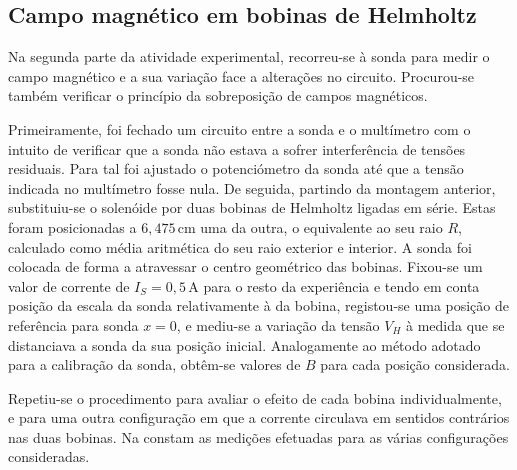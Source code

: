 \subsection{Campo magnético em bobinas de Helmholtz}
Na segunda parte da atividade experimental, recorreu-se à sonda para medir o campo magnético e a sua variação face a alterações no circuito. Procurou-se também verificar o princípio da sobreposição de campos magnéticos.


Primeiramente, foi fechado um circuito entre a sonda e o multímetro com o intuito de verificar que a sonda não estava a sofrer interferência de tensões residuais. Para tal foi ajustado o potenciómetro da sonda até que a tensão indicada no multímetro fosse nula. De seguida, partindo da montagem anterior, substituiu-se o solenóide por duas bobinas de Helmholtz ligadas em série. Estas foram posicionadas a $6,475 \, \unit{\cm}$ uma da outra, o equivalente ao seu raio $R$, calculado como média aritmética do seu raio exterior e interior.
A sonda foi colocada de forma a atravessar o centro geométrico das bobinas. Fixou-se um valor de corrente de $I_S = 0,5 \, \unit{\ampere}$ para o resto da experiência e tendo em conta posição da escala da sonda relativamente à da bobina, registou-se uma posição de referência para sonda $x = 0$, e mediu-se a variação da tensão $V_H$ à medida que se distanciava  a sonda da sua posição inicial. Analogamente ao método adotado para a calibração da sonda, obtêm-se valores de $B$ para cada posição considerada.


Repetiu-se o procedimento para avaliar o efeito de cada bobina individualmente, e para uma outra configuração em que a corrente circulava em sentidos contrários nas duas bobinas. Na  constam as medições efetuadas para as várias configurações consideradas.

